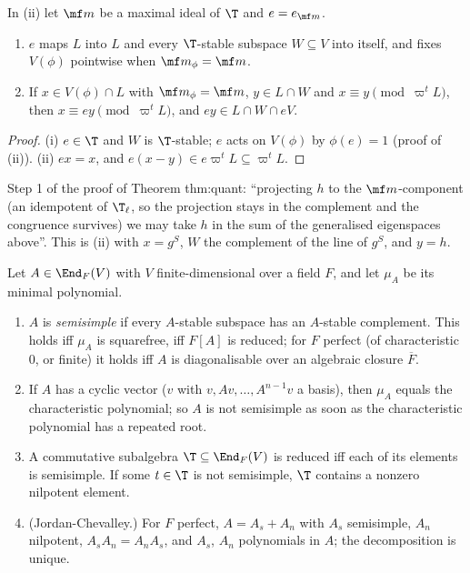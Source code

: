 \begin{proposition}\label{prop:modules:idempotent-congruence}
In (ii) let $\mf m$ be a maximal ideal of $\T$ and $e=e_{\mf m}$.
\begin{enumerate}[label=(\roman*)]
\item $e$ maps $L$ into $L$ and every $\T$-stable subspace $W\subseteq V$ into itself, and fixes $V(\phi)$ pointwise when $\mf m_\phi=\mf m$.
\item If $x\in V(\phi)\cap L$ with $\mf m_\phi=\mf m$, $y\in L\cap W$ and $x\equiv y\pmod{\varpi^tL}$, then $x\equiv ey\pmod{\varpi^tL}$, and $ey\in L\cap W\cap eV$.
\end{enumerate}
\end{proposition}

\begin{proof}
(i) $e\in\T$ and $W$ is $\T$-stable; $e$ acts on $V(\phi)$ by $\phi(e)=1$ (proof of (ii)). (ii) $ex=x$, and $e(x-y)\in e\varpi^tL\subseteq\varpi^tL$.
\end{proof}

\begin{paperlink}\label{pl:modules:projection}
Step 1 of the proof of Theorem thm:quant: ``projecting $h$ to the $\mf m$-component (an idempotent of $\T_\ell$, so the projection stays in the complement and the
congruence survives) we may take $h$ in the sum of the generalised eigenspaces above''. This is (ii) with $x=g^S$, $W$ the
complement of the line of $g^S$, and $y=h$.
\end{paperlink}

\begin{proposition}\label{prop:modules:semisimple-operators}
Let $A\in\End_F(V)$ with $V$ finite-dimensional over a field $F$, and let $\mu_A$ be its minimal polynomial.
\begin{enumerate}[label=(\roman*)]
\item $A$ is \emph{semisimple} if every $A$-stable subspace has an $A$-stable complement. This holds iff $\mu_A$ is squarefree, iff $F[A]$ is reduced; for $F$ perfect
(of characteristic $0$, or finite) it holds iff $A$ is diagonalisable over an algebraic closure $\overline F$.
\item If $A$ has a cyclic vector ($v$ with $v,Av,\dots,A^{n-1}v$ a basis), then $\mu_A$ equals the characteristic polynomial; so $A$ is not semisimple as soon as
the characteristic polynomial has a repeated root.
\item A commutative subalgebra $\T\subseteq\End_F(V)$ is reduced iff each of its elements is semisimple. If some $t\in\T$ is not semisimple, $\T$ contains a nonzero
nilpotent element.
\item (Jordan-Chevalley.) For $F$ perfect, $A=A_s+A_n$ with $A_s$ semisimple, $A_n$ nilpotent, $A_sA_n=A_nA_s$, and $A_s$, $A_n$ polynomials in $A$; the decomposition is
unique.
\end{enumerate}
\end{proposition}

